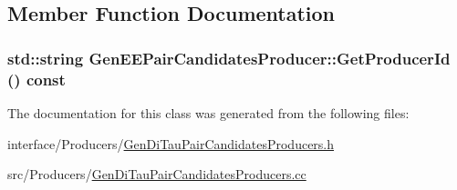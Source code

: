 \subsection{Member Function Documentation}
\hypertarget{classGenEEPairCandidatesProducer_afd5130afa3dfb2d2d02113e73e1ff35e}{
\subsubsection[{GetProducerId}]{\setlength{\rightskip}{0pt plus 5cm}std::string GenEEPairCandidatesProducer::GetProducerId () const}}
\label{classGenEEPairCandidatesProducer_afd5130afa3dfb2d2d02113e73e1ff35e}


The documentation for this class was generated from the following files:\begin{DoxyCompactItemize}
\item 
interface/Producers/\hyperlink{GenDiTauPairCandidatesProducers_8h}{GenDiTauPairCandidatesProducers.h}\item 
src/Producers/\hyperlink{GenDiTauPairCandidatesProducers_8cc}{GenDiTauPairCandidatesProducers.cc}\end{DoxyCompactItemize}
